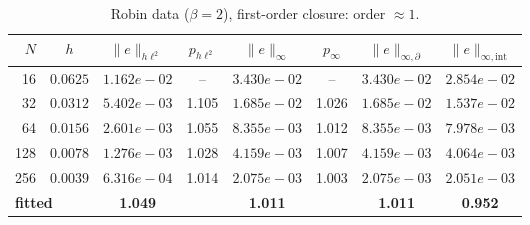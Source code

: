 \begin{table}[H]
\centering\small
\caption{Robin data ($\beta=2$), first-order closure: order $\approx 1$.}
\label{tab:conv-onesided-robin}
\begin{tabular}{rccccccc}
\toprule
$N$ & $h$ & $\lVert e\rVert_{h\ell^2}$ & $p_{h\ell^2}$ & $\lVert e\rVert_{\infty}$ & $p_{\infty}$ & $\lVert e\rVert_{\infty,\partial}$ & $\lVert e\rVert_{\infty,\mathrm{int}}$ \\
\midrule
16 & $0.0625$ & $1.162e-02$ & -- & $3.430e-02$ & -- & $3.430e-02$ & $2.854e-02$ \\
32 & $0.0312$ & $5.402e-03$ & 1.105 & $1.685e-02$ & 1.026 & $1.685e-02$ & $1.537e-02$ \\
64 & $0.0156$ & $2.601e-03$ & 1.055 & $8.355e-03$ & 1.012 & $8.355e-03$ & $7.978e-03$ \\
128 & $0.0078$ & $1.276e-03$ & 1.028 & $4.159e-03$ & 1.007 & $4.159e-03$ & $4.064e-03$ \\
256 & $0.0039$ & $6.316e-04$ & 1.014 & $2.075e-03$ & 1.003 & $2.075e-03$ & $2.051e-03$ \\
\midrule
\multicolumn{2}{l}{\textbf{fitted}} & \textbf{1.049} & & \textbf{1.011} & & \textbf{1.011} & \textbf{0.952} \\
\bottomrule
\end{tabular}
\end{table}
